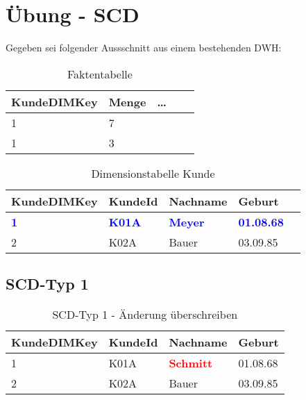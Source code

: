 \section{Übung - SCD}
\label{sec:uebung_04}
Gegeben sei folgender Aussschnitt aus einem bestehenden DWH:

\begin{table}[H]
  \centering
  \ttfamily
  \small
  \begin{tabular}{|l|l|l|l|l|}
    \hline
    \textbf{KundeDIMKey}  & \textbf{Menge} & \textbf{\dots}       \\
    \hline
    1                     & 7              &                      \\
    1                     & 3               &                     \\
    \hline
  \end{tabular}
  \caption{Faktentabelle}
\end{table}

\begin{table}[H]
  \centering
  \ttfamily
  \small
  \begin{tabular}{|l|l|l|l|l|}
    \hline
    \textbf{KundeDIMKey}          & \textbf{KundeId}                & \textbf{Nachname}                 & \textbf{Geburt}                       \\
    \hline
    \textbf{\textcolor{blue}{1}}  & \textbf{\textcolor{blue}{K01A}} & \textbf{\textcolor{blue}{Meyer}}  & \textbf{\textcolor{blue}{01.08.68}}   \\
    2                             & K02A                            & Bauer                             & 03.09.85                              \\
    \hline
  \end{tabular}
  \caption{Dimensionstabelle Kunde}
\end{table}

\subsection{SCD-Typ 1}
\label{sec:uebung_05.aufgabe_1a}

\begin{table}[H]
  \centering
  \ttfamily
  \small
  \begin{tabular}{|l|l|l|l|}
    \hline
    \textbf{KundeDIMKey}  & \textbf{KundeId}  & \textbf{Nachname}                 & \textbf{Geburt} \\
    \hline
    1                     & K01A              & \textbf{\textcolor{red}{Schmitt}} & 01.08.68        \\
    2                     & K02A              & Bauer                             & 03.09.85        \\
    \hline
  \end{tabular}
  \caption{SCD-Typ 1 - Änderung überschreiben}
\end{table}

